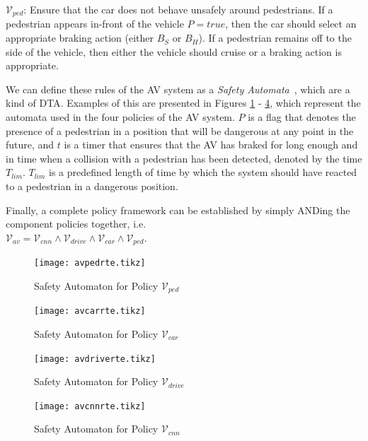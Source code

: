 $\mathcal{V}_{ped}$: Ensure that the car does not behave unsafely around pedestrians. If a pedestrian appears in-front of the vehicle $P=true$, then the car should select an appropriate braking action (either $B_S$ or $B_H$). If a pedestrian remains off to the side of the vehicle, then either the vehicle should cruise or a braking action is appropriate.

We can define these rules of the \ac{AV} system as a \textit{Safety Automata}~\cite{recps}, which are a kind of \acf{DTA}. 
Examples of this are presented in Figures \ref{fig:avpedrte} - \ref{fig:avcnnrte}, which represent the automata used in the four policies of the \ac{AV} system.
$P$ is a flag that denotes the presence of a pedestrian in a position that will be dangerous at any point in the future, and $t$ is a timer that ensures that the \ac{AV} has braked for long enough and in time when a collision with a pedestrian has been detected, denoted by the time $T_{lim}$. 
$T_{lim}$ is a predefined length of time by which the system should have reacted to a pedestrian in a dangerous position.

Finally, a complete policy framework can be established by simply ANDing the component policies together, i.e. \\ $\mathcal{V}_{av} = \mathcal{V}_{cnn} \wedge \mathcal{V}_{drive} \wedge \mathcal{V}_{car} \wedge \mathcal{V}_{ped}$.

\begin{figure}[t]
	\centering
	\texttt{[image: avpedrte.tikz]}
	\caption{Safety Automaton for Policy $\mathcal{V}_{ped}$\label{fig:avpedrte}}
\end{figure}
\begin{figure}[t]
	\centering
	\texttt{[image: avcarrte.tikz]}
	\caption{Safety Automaton for Policy $\mathcal{V}_{car}$\label{fig:avcarrte}}
\end{figure}
\begin{figure}[t]
	\centering
	\texttt{[image: avdriverte.tikz]}
	\caption{Safety Automaton for Policy $\mathcal{V}_{drive}$\label{fig:avdriverte}}
\end{figure}
\begin{figure}[t]
	\centering
	\texttt{[image: avcnnrte.tikz]}
	\caption{Safety Automaton for Policy $\mathcal{V}_{cnn}$\label{fig:avcnnrte}}
\end{figure}


